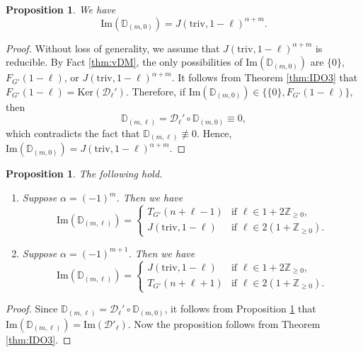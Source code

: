 \documentclass[reqno,11pt]{amsart}
\newtheorem{prop}[equation]{Proposition}
\theoremstyle{remark}
\theoremstyle{definition}
\numberwithin{equation}{section}
\newcommand{\ga}{\alpha}
\newcommand{\Z}{\mathbb{Z}}
\newcommand{\Cal}{\mathcal}
\renewcommand{\Im}{\mathrm{Im}}
\newcommand{\triv}{\mathrm{triv}}
\newcommand{\Ker}{\mathrm{Ker}}
\newcommand{\D}{\Cal{D}}
\newcommand{\bD}{\mathbb{D}}
\begin{document}
\begin{prop}\label{prop:im1}
We have
\begin{equation*}
\Im(\bD_{(m,0)})=J(\triv,1-\ell)^{\ga+m}.
\end{equation*}
\end{prop}

\begin{proof}
Without loss of generality, we assume that $J(\triv,1-\ell)^{\ga+m}$ 
is reducible. By Fact \ref{thm:vDM}, the only possibilities of $\Im(\bD_{(m,0)})$ are 
$\{0\}$, $F_{G'}(1-\ell)$, or $J(\triv, 1-\ell)^{\ga +m}$. 
It follows from Theorem \ref{thm:IDO3} that $F_{G'}(1-\ell) = \Ker(\D_\ell')$.
Therefore, if $\Im(\bD_{(m,0)}) \in \{\{0\}, F_{G'}(1-\ell)\}$, then
\begin{equation*}
\bD_{(m,\ell)} = \D_\ell' \circ \bD_{(m,0)} \equiv 0,
\end{equation*}
which contradicts the fact that $\bD_{(m,\ell)} \not\equiv 0$.
Hence, $\Im(\bD_{(m,0)}) = J(\triv, 1-\ell)^{\ga+m}$.
\end{proof}

\begin{prop}\label{prop:im2}
The following hold.
\begin{enumerate}
\item[\emph{(1)}] Suppose $\ga = (-1)^m$. Then we have
\begin{equation*}
\Im(\bD_{(m,\ell)})
=
\begin{cases}
T_{G'}(n+\ell-1) &\text{if $\ell \in 1+2\Z_{\geq 0}$},\\[3pt]
J(\triv, 1-\ell) &\text{if $\ell \in 2(1+\Z_{\geq 0})$}.
\end{cases}
\end{equation*}

\item[\emph{(2)}] Suppose $\ga = (-1)^{m+1}$. Then we have
\begin{equation*}
\Im(\bD_{(m,\ell)})
=
\begin{cases}
J(\triv, 1-\ell) &\text{if $\ell \in 1+2\Z_{\geq 0}$},\\[3pt]
T_{G'}(n+\ell+1) &\text{if $\ell \in 2(1+\Z_{\geq 0})$}.
\end{cases}
\end{equation*}

\end{enumerate}
\end{prop}

\begin{proof}
Since $\bD_{(m,\ell)} = \D_\ell' \circ \bD_{(m,0)}$,
it follows from Proposition \ref{prop:im1} that 
$\Im(\bD_{(m,\ell)}) = \Im(\D'_\ell)$. Now the proposition follows from 
Theorem \ref{thm:IDO3}.
\end{proof}
\end{document}
